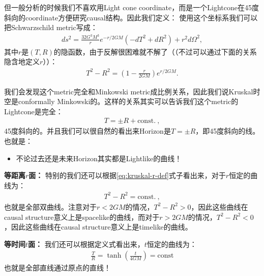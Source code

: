 \bigskip
{}

但一般分析的时候我们不喜欢用Light cone
coordinate，而是一个Lightcone在45度斜向的coordinate方便研究causal结构。因此我们定义：
使用这个坐标系我们可以把Schwarzschild metric写成：
\begin{align}\label{eq:kruskal-metric}
  ds^2=\frac{32G^3M^3}{r}e^{-r/2GM}(-dT^2+dR^2)+r^2d\Omega^2,
\end{align}
其中$ r $是$ (T,R) $的隐函数，由于反解很困难就不解了（（不过可以通过下面的关系隐含地定义$ r $））：
\begin{align}\label{eq:kruskal-r-def}
  T^2-R^2=\left(1-\frac{r}{2GM}\right)e^{r/2GM}.
\end{align}

\bigskip
{}

我们会发现这个metric完全和Minkowski metric成比例关系，因此我们说Kruskal时空是conformally
Minkowski的。这样的关系其实可以告诉我们这个metric的Lightcone是完全：
\begin{align}
  T=\pm R+\mathrm{const.~},
\end{align}
45度斜向的。并且我们可以很自然的看出来Horizon是$ T=\pm R $，即45度斜向的线。也就是：
\begin{itemize}
  \item 不论过去还是未来Horizon其实都是Lightlike的曲线！
\end{itemize}

\textbf{等距离$ r $面：}
特别的我们还可以根据\cref{eq:kruskal-r-def}式子看出来，对于$ r $恒定的曲线为：
\begin{align}
  T^2-R^2=\mathrm{const.~},
\end{align}
也就是全部双曲线。注意对于$ r<2GM $的情况，$ T^2-R^2>0 $，因此这些曲线在causal
structure意义上是spacelike的曲线，而对于$ r>2GM $的情况，$ T^2-R^2<0 $，因此这些曲线在causal
structure意义上是timelike的曲线。

\textbf{等时间$ t $面：}
我们还可以根据定义式看出来，$ t $恒定的曲线为：
\begin{align}
  \frac{T}{R}=\tanh\left(\frac{t}{4GM}\right) = \text{const}
\end{align}
也就是全部直线通过原点的直线！

